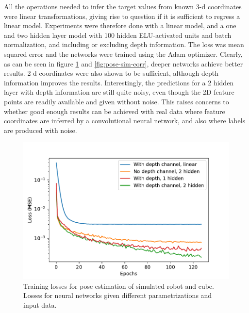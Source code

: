 All the operations needed to infer the target values from known 3-d coordinates
were linear transformations, giving rise to question if it is sufficient to
regress a linear model. Experiments were therefore done with a linear model,
and a one and two hidden layer model with 100 hidden ELU-activated units and
batch normalization, and including or excluding depth information. The loss was
mean squared error and the networks were trained using the Adam optimizer.
Clearly, as can be seen in figure \ref{fig:pose-sim-losses} and
\ref{fig:pose-sim-corr}, deeper networks achieve better results. 2-d
coordinates were also shown to be sufficient, although depth information
improves the results. Interestingly, the predictions for a 2 hidden layer with
depth information are still quite noisy, even though the 2D feature points are
readily available and given without noise. This raises concerns to whether good
enough results can be achieved with real data where feature coordinates are
inferred by a convolutional neural network, and also where labels are produced
with noise.

\begin{figure}[h!]
    \centering
    \includegraphics[width=0.7 \textwidth]{res/pose_sim_losses.pdf}

    \caption{Training losses for pose estimation of simulated robot and cube.
    Losses for neural networks given different parametrizations and input
    data.}

    \label{fig:pose-sim-losses}
    
\end{figure}


